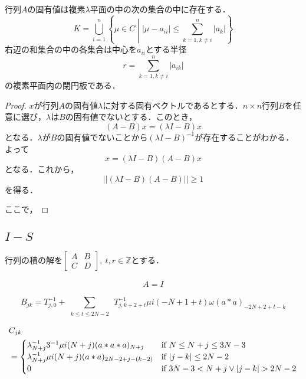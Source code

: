 \documentclass[11pt,a4paper]{jsarticle}
\theoremstyle{definition}
\begin{document}
\dfn[ゲルシュゴリンの定理]
行列$A$の固有値は複素$\lambda$平面の中の次の集合の中に存在する．
\begin{equation}
  K=\bigcup_{i=1}^{n} \left\{ \mu \in C \middle| |\mu - a_{ii}| \leq \sum_{k=1,k\neq i}^{n} |a_k| \right\}
\end{equation}
右辺の和集合の中の各集合は中心を$a_{ii}$とする半径
\begin{equation}
  r=\sum_{k=1,k\neq i}^{n} |a_{ik}|
\end{equation}
の複素平面内の閉円板である．

\begin{proof}
  $x$が行列$A$の固有値$\lambda$に対する固有ベクトルであるとする．$n \times n$行列$B$を任意に選び，$\lambda$は$B$の固有値でないとする．このとき，
  \begin{equation}
    (A-B)x = (\lambda I - B)x
  \end{equation}
  となる．$\lambda$が$B$の固有値でないことから$(\lambda I - B)^{-1}$が存在することがわかる．よって
  \begin{equation}
    x=(\lambda I - B)(A-B)x
  \end{equation}
  となる．これから，
  \begin{equation}
    || (\lambda I - B)(A-B) || \geq 1
  \end{equation}
  を得る．

  ここで，
\end{proof}

\subsection*{$I-S$}
行列の積の解を$\begin{bmatrix} A & B \\ C & D\end{bmatrix},\ t,r\in \mathbb{Z}$とする．

\begin{equation}
  \begin{split}
    A = I
  \end{split}
\end{equation}

\begin{equation}
    B_{jk} = T_{j,0}^{-1}+\sum_{\substack{k \leq t \leq 2N-2}} \, T_{j,k+2+t}^{-1} \mu i (- N + 1 + t) \omega (a*a)_{-2N+2+t-k}
\end{equation}

\begin{equation}
  \begin{split}
    &C_{jk} \\
    &=\begin{cases}
      \lambda_{N+j}^{-1} 3^{-1} \mu i (N+j) (a*a*a)_{N+j} & \text{if $N \leq N+j \leq 3N-3$} \\
      \lambda_{N+j}^{-1} \mu i (N+j) (a*a)_{2N-2 + j - (k-2)} & \text{if $ |j - k| \leq 2N-2$} \\
      0 & \text{if $3N-3 < N+j \lor |j - k| > 2N-2$}
    \end{cases}
  \end{split}
\end{equation}
\end{document}
